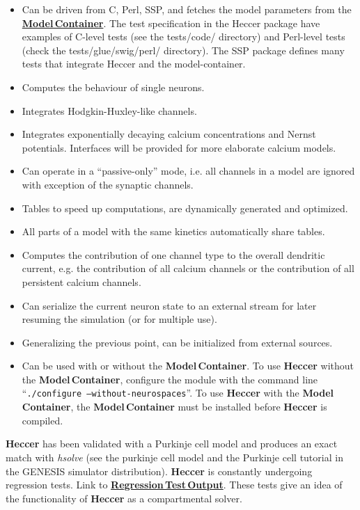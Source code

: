 \documentclass[12pt]{article}
\begin{document}
\begin{itemize}

\item Can be driven from C, Perl, SSP, and fetches the model
  parameters from the
  \href{../model-container/model-container.tex}{\bf Model\,Container}.
  The test specification in the Heccer package have examples of
  C-level tests (see the tests/code/ directory) and Perl-level tests
  (check the tests/glue/swig/perl/ directory).  The SSP package
  defines many tests that integrate Heccer and the model-container.
\item Computes the behaviour of single neurons.
\item Integrates Hodgkin-Huxley-like channels.
\item Integrates exponentially decaying calcium concentrations and Nernst potentials. Interfaces will be provided for more elaborate calcium models.
\item Can operate in a ``passive-only'' mode, i.e. all channels in a model are ignored with exception of the synaptic channels.
\item Tables to speed up computations, are dynamically generated and optimized.
\item All parts of a model with the same kinetics automatically share tables.
\item Computes the contribution of one channel type to the overall dendritic current, e.g. the contribution of all calcium channels or the contribution of all persistent calcium channels.
\item Can serialize the current neuron state to an external stream for later resuming the simulation (or for multiple use).
\item Generalizing the previous point, can be initialized from external sources.
\item Can be used with or without the {\bf Model\,Container}. To use {\bf Heccer} without the {\bf Model\,Container}, configure the module with the command line ``{\tt ./configure --without-neurospaces}''. To use {\bf Heccer} with the {\bf Model\,Container}, the {\bf Model\,Container} must be installed before {\bf Heccer} is compiled. 
\end{itemize}
{\bf Heccer} has been validated with a Purkinje cell model and produces an exact match with {\it hsolve} (see the purkinje cell model and the Purkinje cell tutorial in the GENESIS simulator distribution). {\bf Heccer} is constantly undergoing regression tests. Link to  \href{http://neurospaces.sourceforge.net/neurospaces_project/heccer/tests/html/index.html}{\bf Regression\,Test\,Output}. These tests give an idea of the functionality of {\bf Heccer} as a compartmental solver.
\end{document}
